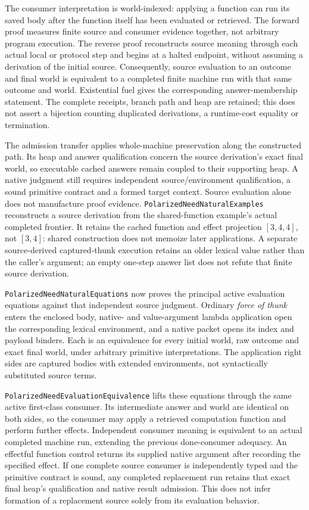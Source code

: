 \documentclass[11pt]{article}
\theoremstyle{definition}
\theoremstyle{remark}
\begin{document}
The consumer interpretation is world-indexed: applying a function can run
its saved body after the function itself has been evaluated or retrieved.
The forward proof measures finite source and consumer evidence together,
not arbitrary program execution. The reverse proof reconstructs source
meaning through each actual local or protocol step and begins at a halted
endpoint, without assuming a derivation of the initial source. Consequently,
source evaluation to an outcome and final world is equivalent to a completed
finite machine run with that same outcome and world. Existential fuel gives
the corresponding answer-membership statement. The complete receipts,
branch path and heap are retained; this does not assert a bijection counting
duplicated derivations, a runtime-cost equality or termination.

The admission transfer applies whole-machine preservation along the
constructed path. Its heap and answer qualification concern the source
derivation's exact final world, so executable cached answers remain coupled
to their supporting heap. A native judgment still requires independent
source/environment qualification, a sound primitive contract and a formed
target context. Source evaluation alone does not manufacture proof evidence.
\nolinkurl{PolarizedNeedNaturalExamples} reconstructs a source derivation from
the shared-function example's actual completed frontier. It retains the
cached function and effect projection $[3,4,4]$, not $[3,4]$: shared
construction does not memoize later applications. A separate source-derived
captured-thunk execution retains an older lexical value rather than the
caller's argument; an empty one-step answer list does not refute that finite
source derivation.

\nolinkurl{PolarizedNeedNaturalEquations} now proves the principal active
evaluation equations against that independent source judgment. Ordinary
\emph{force of thunk} enters the enclosed body, native- and value-argument
lambda application open the corresponding lexical environment, and a native
packet opens its index and payload binders. Each is an equivalence for every
initial world, raw outcome and exact final world, under arbitrary primitive
interpretations. The application right sides are captured bodies with extended
environments, not syntactically substituted source terms.

\nolinkurl{PolarizedNeedEvaluationEquivalence} lifts these equations through
the same active first-class consumer. Its intermediate answer and world are
identical on both sides, so the consumer may apply a retrieved computation
function and perform further effects. Independent consumer meaning is
equivalent to an actual completed machine run, extending the previous
done-consumer adequacy. An effectful function control returns its supplied
native argument after recording the specified effect. If one complete
source consumer is independently typed and the primitive contract is sound,
any completed replacement run retains that exact final heap's qualification
and native result admission. This does not infer formation of a replacement
source solely from its evaluation behavior.
\end{document}
